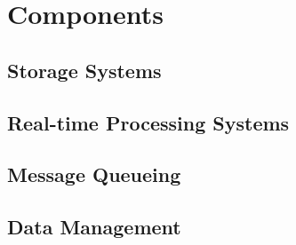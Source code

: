 \chapter{Components}
\label{chap:components}

\section{Storage Systems}





\section{Real-time Processing Systems}




\section{Message Queueing}






\section{Data Management}


